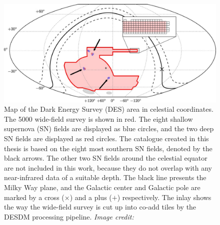 \begin{figure}[htb] 
\centering    
\includegraphics[width=1.0\textwidth]{Chapter2/Figs/DES_footprint_arrows.jpg}
\caption[Map of the DES footprint]{Map of the Dark Energy Survey (DES) area in celestial coordinates. The \SI{5000}{\sqdeg} wide-field survey is shown in red. The eight shallow supernova (SN) fields are displayed as blue circles, and the two deep SN fields are displayed as red circles. The catalogue created in this thesis is based on the eight most southern SN fields, denoted by the black arrows. The other two SN fields around the celestial equator are not included in this work, because they do not overlap with any near-infrared data of a suitable depth. The black line presents the Milky Way plane, and the Galactic center and Galactic pole are marked by a cross ($\times$) and a plus ($+$) respectively. The inlay shows the way the wide-field survey is cut up into co-add tiles by the DESDM processing pipeline. \textit{Image credit:} \cite{2018ApJS..239...18A}}
\label{fig:DES_footprint}
\end{figure}


